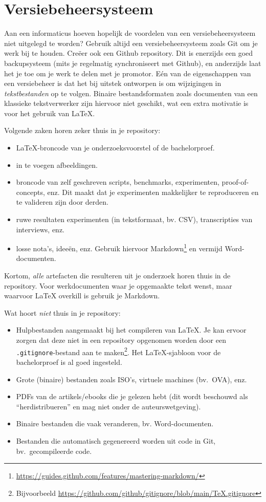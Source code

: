 \section{Versiebeheersysteem}%
\label{sec:versiebeheersysteem}

Aan een informaticus hoeven hopelijk de voordelen van een versiebeheersysteem niet uitgelegd te worden? Gebruik altijd een versiebeheersysteem zoals Git om je werk bij te houden. Creëer ook een Github repository. Dit is enerzijds een goed backupsysteem (mits je regelmatig synchroniseert met Github), en anderzijds laat het je toe om je werk te delen met je promotor. Eén van de eigenschappen van een versiebeheer is dat het bij uitstek ontworpen is om wijzigingen in \emph{tekstbestanden} op te volgen. Binaire bestandsformaten zoals documenten van een klassieke tekstverwerker zijn hiervoor niet geschikt, wat een extra motivatie is voor het gebruik van \LaTeX{}.

Volgende zaken horen zeker thuis in je repository:

\begin{itemize}
  \item \LaTeX{}-broncode van je onderzoeksvoorstel of de bachelorproef.
  \item in te voegen afbeeldingen.
  \item broncode van zelf geschreven scripts, benchmarks, experimenten, proof-of-concepts, enz. Dit maakt dat je experimenten makkelijker te reproduceren en te valideren zijn door derden.
  \item ruwe resultaten experimenten (in tekstformaat, bv. CSV), transcripties van interviews, enz.
  \item losse nota's, ideeën, enz. Gebruik hiervoor Markdown\footnote{\url{https://guides.github.com/features/mastering-markdown/}} en vermijd Word-do\-cu\-men\-ten.
\end{itemize}

Kortom, \emph{alle} artefacten die resulteren uit je onderzoek horen thuis in de repository. Voor werkdocumenten waar je opgemaakte tekst wenst, maar waarvoor \LaTeX{} overkill is gebruik je Markdown.

Wat hoort \emph{niet} thuis in je repository:

\begin{itemize}
  \item Hulpbestanden aangemaakt bij het compileren van \LaTeX{}. Je kan ervoor zorgen dat deze niet in een repository opgenomen worden door een \texttt{.gitignore}-bestand aan te maken\footnote{Bijvoorbeeld \url{https://github.com/github/gitignore/blob/main/TeX.gitignore}}. Het \LaTeX{}-sjabloon voor de bachelorproef is al goed ingesteld.
  \item Grote (binaire) bestanden zoals ISO's, virtuele machines (bv.\ OVA), enz.
  \item PDFs van de artikels/ebooks die je gelezen hebt (dit wordt beschouwd als ``herdistribueren'' en mag niet onder de auteurswetgeving).
  \item Binaire bestanden die vaak veranderen, bv. Word-documenten.
  \item Bestanden die automatisch gegenereerd worden uit code in Git, bv.\ gecompileerde code.
\end{itemize}

